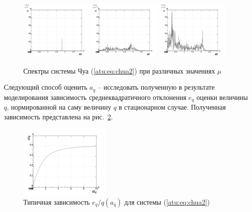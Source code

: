 \begin{figure}[htb!]
\centerline{
  \includegraphics[width=0.32\textwidth]{p/cha/chua/chua_f-p_f_mu=2x00.png}
  \includegraphics[width=0.32\textwidth]{p/cha/chua/chua_f-p_f_mu=2x74.png}
  \includegraphics[width=0.32\textwidth]{p/cha/chua/chua_f-p_f_mu=4x50.png}
}
\caption{Спектры системы Чуа (\ref{atu:eq:chua2}) при различных значениях $\mu$}
\label{atu:f:chua_spectrum}
\end{figure}

Следующий способ оценить $a_q$ -- исследовать полученную в результате моделирования
зависимость среднеквадратичного отклонения $e_q$ оценки величины $q$, нормированной
на саму величину $q$ в стационарном случае. Полученная зависимость представлена
на рис.~\ref{atu:f:chua_tau}.

\begin{figure}[htb!]
\centerline{
  \includegraphics[width=0.4\textwidth]{p/cha/chua/chua_tau-p_e_a.png}
}
\caption{Типичная зависимость $e_q/q(a_q)$ для системы (\ref{atu:eq:chua2})}
\label{atu:f:chua_tau}
\end{figure}

